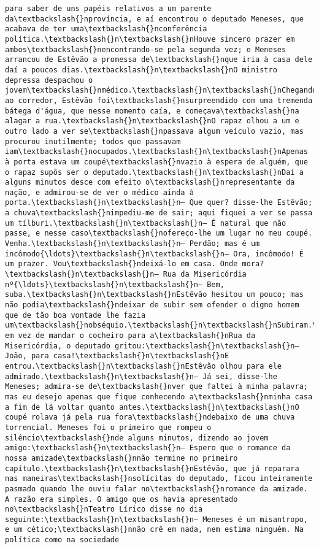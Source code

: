 \begin{Verbatim}[commandchars=\\\{\}]
para saber de uns papéis relativos a um parente da\textbackslash{}nprovíncia, e aí encontrou o deputado Meneses, que acabava de ter uma\textbackslash{}nconferência política.\textbackslash{}n\textbackslash{}nHouve sincero prazer em ambos\textbackslash{}nencontrando-se pela segunda vez; e Meneses arrancou de Estêvão a promessa de\textbackslash{}nque iria à casa dele daí a poucos dias.\textbackslash{}n\textbackslash{}nO ministro depressa despachou o jovem\textbackslash{}nmédico.\textbackslash{}n\textbackslash{}nChegando ao corredor, Estêvão foi\textbackslash{}nsurpreendido com uma tremenda bátega d'água, que nesse momento caía, e começava\textbackslash{}na alagar a rua.\textbackslash{}n\textbackslash{}nO rapaz olhou a um e outro lado a ver se\textbackslash{}npassava algum veículo vazio, mas procurou inutilmente; todos que passavam iam\textbackslash{}nocupados.\textbackslash{}n\textbackslash{}nApenas à porta estava um coupé\textbackslash{}nvazio à espera de alguém, que o rapaz supôs ser o deputado.\textbackslash{}n\textbackslash{}nDaí a alguns minutos desce com efeito o\textbackslash{}nrepresentante da nação, e admirou-se de ver o médico ainda à porta.\textbackslash{}n\textbackslash{}n— Que quer? disse-lhe Estêvão; a chuva\textbackslash{}nimpediu-me de sair; aqui fiquei a ver se passa um tílburi.\textbackslash{}n\textbackslash{}n— É natural que não passe, e nesse caso\textbackslash{}nofereço-lhe um lugar no meu coupé. Venha.\textbackslash{}n\textbackslash{}n— Perdão; mas é um incômodo{\ldots}\textbackslash{}n\textbackslash{}n— Ora, incômodo! É um prazer. Vou\textbackslash{}ndeixá-lo em casa. Onde mora?\textbackslash{}n\textbackslash{}n— Rua da Misericórdia nº{\ldots}\textbackslash{}n\textbackslash{}n— Bem, suba.\textbackslash{}n\textbackslash{}nEstêvão hesitou um pouco; mas não podia\textbackslash{}ndeixar de subir sem ofender o digno homem que de tão boa vontade lhe fazia um\textbackslash{}nobséquio.\textbackslash{}n\textbackslash{}nSubiram.\textbackslash{}n\textbackslash{}nMas em vez de mandar o cocheiro para a\textbackslash{}nRua da Misericórdia, o deputado gritou:\textbackslash{}n\textbackslash{}n— João, para casa!\textbackslash{}n\textbackslash{}nE entrou.\textbackslash{}n\textbackslash{}nEstêvão olhou para ele admirado.\textbackslash{}n\textbackslash{}n— Já sei, disse-lhe Meneses; admira-se de\textbackslash{}nver que faltei à minha palavra; mas eu desejo apenas que fique conhecendo a\textbackslash{}nminha casa a fim de lá voltar quanto antes.\textbackslash{}n\textbackslash{}nO coupé rolava já pela rua fora\textbackslash{}ndebaixo de uma chuva torrencial. Meneses foi o primeiro que rompeu o silêncio\textbackslash{}nde alguns minutos, dizendo ao jovem amigo:\textbackslash{}n\textbackslash{}n— Espero que o romance da nossa amizade\textbackslash{}nnão termine no primeiro capítulo.\textbackslash{}n\textbackslash{}nEstêvão, que já reparara nas maneiras\textbackslash{}nsolícitas do deputado, ficou inteiramente pasmado quando lhe ouviu falar no\textbackslash{}nromance da amizade. A razão era simples. O amigo que os havia apresentado no\textbackslash{}nTeatro Lírico disse no dia seguinte:\textbackslash{}n\textbackslash{}n— Meneses é um misantropo, e um cético;\textbackslash{}nnão crê em nada, nem estima ninguém. Na política como na sociedade 
\end{Verbatim}
